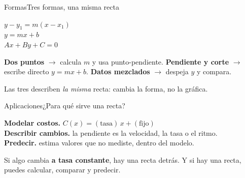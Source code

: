 \documentclass[12pt]{article}
\begin{document}
\begin{mwmodlamina}[mwvioleta]{Formas}{Tres formas, una misma recta}
\begin{mwcaja}
  \quad
    $y-y_1=m(x-x_1)$\\[6pt]
  \quad
    $y=mx+b$\\[6pt]
  \quad
    $Ax+By+C=0$
\end{mwcaja}

\begin{mwcajapaso}
  {\mwsmall
  \textbf{Dos puntos} $\rightarrow$ calcula $m$ y usa
  punto-pendiente.\newline
  \textbf{Pendiente y corte} $\rightarrow$ escribe directo
  $y=mx+b$.\newline
  \textbf{Datos mezclados} $\rightarrow$ despeja $y$ y compara.}
\end{mwcajapaso}

\begin{mwcajagris}
  {\mwsmall Las tres describen \emph{la misma} recta: cambia la
  forma, no la gráfica.}
\end{mwcajagris}
\end{mwmodlamina}

\begin{mwmodlamina}[mwnaranja]{Aplicaciones}{¿Para qué sirve una recta?}
\begin{mwcaja}
  \quad
  \textbf{Modelar costos.}\quad
  {\mwsmall $C(x)=(\text{tasa})\,x+(\text{fijo})$}\\[7pt]
  \quad
  \textbf{Describir cambios.}\quad
  {\mwsmall la pendiente es la velocidad, la tasa o el ritmo.}\\[7pt]
  \quad
  \textbf{Predecir.}\quad
  {\mwsmall estima valores que no mediste, dentro del modelo.}
\end{mwcaja}

\begin{mwcaja}
  {\mwsmall Si algo cambia \textbf{a tasa constante}, hay una
  recta detrás. Y si hay una recta, puedes calcular, comparar
  y predecir.}
\end{mwcaja}

\begin{mwcajaformula}
\end{mwcajaformula}
\end{mwmodlamina}
\end{document}
